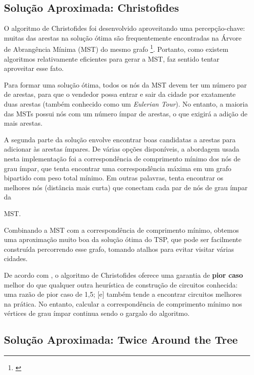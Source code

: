 \subsection{Solução Aproximada: Christofides} \label{sec:chris_explanation}

O algoritmo de Christofides foi desenvolvido aproveitando uma percepção-chave: muitas das arestas na 
solução ótima são frequentemente encontradas na Árvore de Abrangência Mínima (MST) do mesmo grafo 
\footnote{\cite{reducible_explanation}}. Portanto, como existem algoritmos relativamente eficientes 
para gerar a MST, faz sentido tentar aproveitar esse fato.

Para formar uma solução ótima, todos os nós da MST devem ter um número par de arestas, para que 
o vendedor possa entrar e sair da cidade por exatamente duas arestas (também conhecido como um 
\textit{Eulerian Tour}). No entanto, a maioria das MSTs possui nós com um número ímpar de arestas, 
o que exigirá a adição de mais arestas.

A segunda parte da solução envolve encontrar boas candidatas a arestas para adicionar às arestas 
ímpares. De várias opções disponíveis, a abordagem usada nesta implementação foi a correspondência 
de comprimento mínimo dos nós de grau ímpar, que tenta encontrar uma correspondência máxima em um grafo 
bipartido com peso total mínimo. Em outras palavras, tenta encontrar os melhores nós (distância mais curta) 
que conectam cada par de nós de grau ímpar da

 MST.

Combinando a MST com a correspondência de comprimento mínimo, obtemos uma aproximação muito boa 
da solução ótima do TSP, que pode ser facilmente construída percorrendo esse grafo, tomando atalhos 
para evitar visitar várias cidades.

De acordo com \cite{Johnson2003}, o algoritmo de Christofides oferece uma garantia de \textbf{pior caso} melhor 
do que qualquer outra heurística de construção de circuitos conhecida: uma razão de pior caso de 1,5; 
[e] também tende a encontrar circuitos melhores na prática. No entanto, calcular a correspondência 
de comprimento mínimo nos vértices de grau ímpar continua sendo o gargalo do algoritmo.

\subsection{Solução Aproximada: Twice Around the Tree} \label{sec:twice_explanation}

